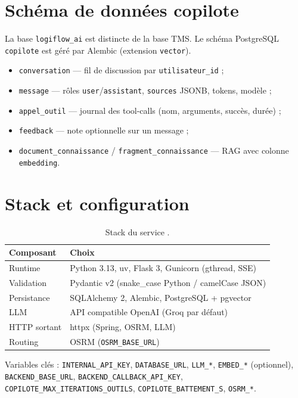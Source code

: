 \section{Schéma de données copilote}

La base \texttt{logiflow\_ai} est distincte de la base TMS. Le schéma PostgreSQL \texttt{copilote}
est géré par Alembic (extension \texttt{vector}).


\begin{itemize}[leftmargin=*]
  \item \texttt{conversation} --- fil de discussion par \texttt{utilisateur\_id} ;
  \item \texttt{message} --- rôles \texttt{user}/\texttt{assistant}, \texttt{sources} JSONB, tokens, modèle ;
  \item \texttt{appel\_outil} --- journal des tool-calls (nom, arguments, succès, durée) ;
  \item \texttt{feedback} --- note optionnelle sur un message ;
  \item \texttt{document\_connaissance} / \texttt{fragment\_connaissance} --- RAG avec colonne \texttt{embedding}.
\end{itemize}

\section{Stack et configuration}

\begin{table}[ht]
\centering
\caption{Stack du service .}
\label{tab:ia-stack}
\begin{tabular}{@{}ll@{}}
\toprule
Composant & Choix \\
\midrule
Runtime & Python 3.13, uv, Flask 3, Gunicorn (gthread, SSE) \\
Validation & Pydantic v2 (snake\_case Python / camelCase JSON) \\
Persistance & SQLAlchemy 2, Alembic, PostgreSQL + pgvector \\
LLM & API compatible OpenAI (Groq par défaut) \\
HTTP sortant & httpx (Spring, OSRM, LLM) \\
Routing & OSRM (\texttt{OSRM\_BASE\_URL}) \\
\bottomrule
\end{tabular}
\end{table}

Variables clés : \texttt{INTERNAL\_API\_KEY}, \texttt{DATABASE\_URL}, \texttt{LLM\_*},
\texttt{EMBED\_*} (optionnel), \texttt{BACKEND\_BASE\_URL}, \texttt{BACKEND\_CALLBACK\_API\_KEY},
\texttt{COPILOTE\_MAX\_ITERATIONS\_OUTILS}, \texttt{COPILOTE\_BATTEMENT\_S}, \texttt{OSRM\_*}.
